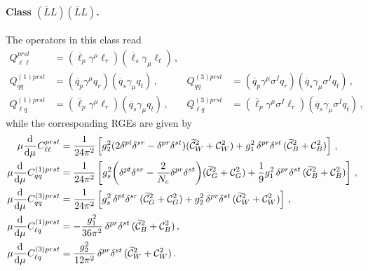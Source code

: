 \paragraph{\texorpdfstring{Class $(\overline{L}L)(\overline{L}L)$}{Class (Lbar L)(Lbar L)}.}
The operators in this class read
\begin{align}
Q_{\ell \ell}^{prst} &= (\overline{\ell}_p \gamma^\mu \ell_r)(\overline{\ell}_s \gamma_\mu \ell_t)\,,&&\\ Q_{q q}^{(1)prst} &= (\overline{q}_p \gamma^\mu q_r)(\overline{q}_s \gamma_\mu q_t)\,,  &Q_{q q}^{(3)prst} &= (\overline{q}_p \gamma^\mu \sigma^I q_r)(\overline{q}_s \gamma_\mu \sigma^I q_t)\,,   \\
Q_{\ell q}^{(1)prst} &= (\overline{\ell}_p \gamma^\mu \ell_r)(\overline{q}_s \gamma_\mu q_t)\,,  &Q_{\ell q}^{(3)prst} &= (\overline{\ell}_p \gamma^\mu \sigma^I \ell_r)(\overline{q}_s \gamma_\mu \sigma^I q_t)\,,
\end{align}
while the corresponding RGEs are given by
\begin{align}
    \mu \dv[]{}{\mu}{C}_{\ell\ell}^{prst} &= \frac{1}{24\pi^2}\left[ g_2^2(2 \delta^{pt}\delta^{sr}- \delta^{pr}\delta^{st})(\widetilde{\mathcal{C}}_{W}^2 + \mathcal{C}_{W}^2)+ g_1^2\, \delta^{pr}\delta^{st}\,(\widetilde{\mathcal{C}}_{B}^2 + \mathcal{C}_{B}^2)\right]\, ,  \\
    \mu \dv[]{}{\mu}{C}_{qq}^{(1)prst} &=\frac{1}{24\pi^2}\left[ g_s^2\bigg(\delta^{pt}\delta^{sr}-\frac{2}{N_c} \delta^{pr}\delta^{st}\bigg)(\widetilde{\mathcal{C}}_{G}^2 + \mathcal{C}_{G}^2)+ \frac{1}{9}g_1^2 \,\delta^{pr}\delta^{st}\,(\widetilde{\mathcal{C}}_{B}^2 + \mathcal{C}_{B}^2)\right]\, , \\
    \mu \dv[]{}{\mu}{C}_{qq}^{(3)prst} &=\frac{1}{24\pi^2}\left[ g_s^2\,\delta^{pt}\delta^{sr}\,(\widetilde{\mathcal{C}}_{G}^2 + \mathcal{C}_{G}^2)+ g_2^2\,\delta^{pr}\delta^{st}\,(\widetilde{\mathcal{C}}_{W}^2 + \mathcal{C}_{W}^2)\right] \,, \\
    \mu \dv[]{}{\mu}{C}_{\ell q}^{(1)prst} &= -\frac{g_1^2}{36\pi^2}\,  \delta^{pr}\delta^{st}\,(\widetilde{\mathcal{C}}_{B}^2 + \mathcal{C}_{B}^2)\, , \\
    \mu \dv[]{}{\mu}{C}_{\ell q}^{(3)prst} &=\frac{g_2^2}{12\pi^2}  \,\delta^{pr}\delta^{st}\,(\widetilde{\mathcal{C}}_{W}^2 + \mathcal{C}_{W}^2)\,.
\end{align}

